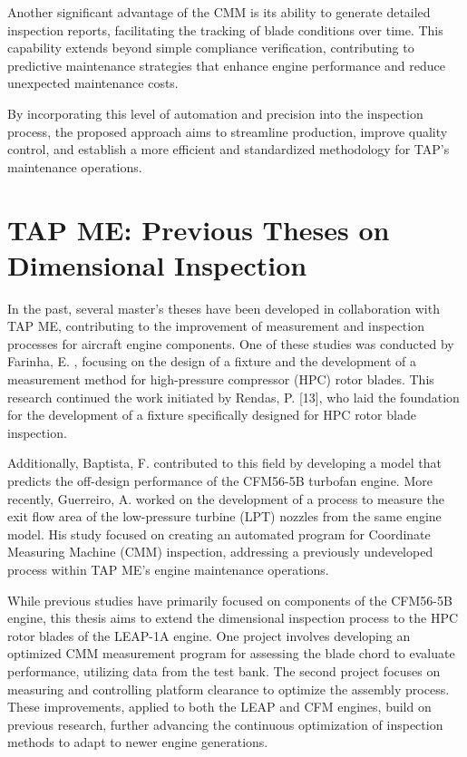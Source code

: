 Another significant advantage of the \gls{CMM} is its ability to generate detailed inspection reports, facilitating the tracking of blade conditions over time. This capability extends beyond simple compliance verification, contributing to predictive maintenance strategies that enhance engine performance and reduce unexpected maintenance costs.

By incorporating this level of automation and precision into the inspection process, the proposed approach aims to streamline production, improve quality control, and establish a more efficient and standardized methodology for \gls{TAP}’s maintenance operations.

\section{TAP ME: Previous Theses on Dimensional Inspection}
\label{sec:before}

In the past, several master's theses have been developed in collaboration with \gls{TAP} \gls{ME}, contributing to the improvement of measurement and inspection processes for aircraft engine components. One of these studies was conducted by Farinha, E. \cite{Farinha2021}, focusing on the design of a fixture and the development of a measurement method for high-pressure compressor (HPC) rotor blades. This research continued the work initiated by Rendas, P. [13], who laid the foundation for the development of a fixture specifically designed for HPC rotor blade inspection.

Additionally, Baptista, F. \cite{rendas2021fixture} contributed to this field by developing a model that predicts the off-design performance of the CFM56-5B turbofan engine. More recently, Guerreiro, A. \cite{guerreiro} worked on the development of a process to measure the exit flow area of the low-pressure turbine (LPT) nozzles from the same engine model. His study focused on creating an automated program for Coordinate Measuring Machine (CMM) inspection, addressing a previously undeveloped process within \gls{TAP} \gls{ME}’s engine maintenance operations.

While previous studies have primarily focused on components of the CFM56-5B engine, this thesis aims to extend the dimensional inspection process to the HPC rotor blades of the LEAP-1A engine. One project involves developing an optimized CMM measurement program for assessing the blade chord to evaluate performance, utilizing data from the test bank. The second project focuses on measuring and controlling platform clearance to optimize the assembly process. These improvements, applied to both the LEAP and CFM engines, build on previous research, further advancing the continuous optimization of inspection methods to adapt to newer engine generations.


